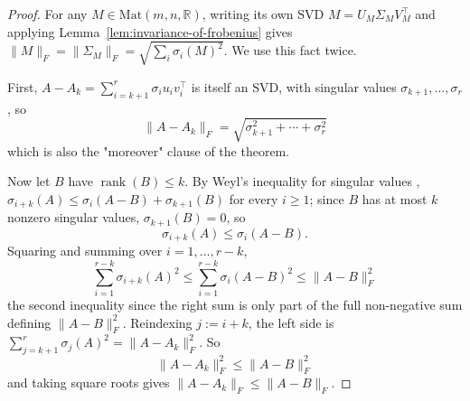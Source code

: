 	\begin{proof}
		For any $M\in\mathrm{Mat}(m,n,\mathbb{R})$, writing its own SVD $M=U_M\Sigma_MV_M^\top$ and applying Lemma~\ref{lem:invariance-of-frobenius} gives $\|M\|_F = \|\Sigma_M\|_F = \sqrt{\sum_i\sigma_i(M)^2}$. We use this fact twice.
		
		First, $A-A_k = \sum_{i=k+1}^r\sigma_iu_iv_i^\top$ is itself an SVD, with singular values $\sigma_{k+1},\dots,\sigma_r$, so
		\[
			\|A-A_k\|_F = \sqrt{\sigma_{k+1}^2+\cdots+\sigma_r^2}
		\]
		which is also the "moreover" clause of the theorem.
		
		Now let $B$ have $\operatorname{rank}(B)\le k$. By Weyl's inequality for singular values \citep{HornJohnson2013}, $\sigma_{i+k}(A) \le \sigma_i(A-B) + \sigma_{k+1}(B)$ for every $i\ge1$; since $B$ has at most $k$ nonzero singular values, $\sigma_{k+1}(B)=0$, so
		\[
			\sigma_{i+k}(A) \le \sigma_i(A-B).
		\]
		Squaring and summing over $i=1,\dots,r-k$,
		\[
			\sum_{i=1}^{r-k}\sigma_{i+k}(A)^2 \le \sum_{i=1}^{r-k}\sigma_i(A-B)^2 \le \|A-B\|_F^2
		\]
		the second inequality since the right sum is only part of the full non-negative sum defining $\|A-B\|_F^2$. Reindexing $j:=i+k$, the left side is $\sum_{j=k+1}^r\sigma_j(A)^2 = \|A-A_k\|_F^2$. So
		\[
			\|A-A_k\|_F^2 \le \|A-B\|_F^2
		\]
		and taking square roots gives $\|A-A_k\|_F \le \|A-B\|_F$.
	\end{proof}
	
	